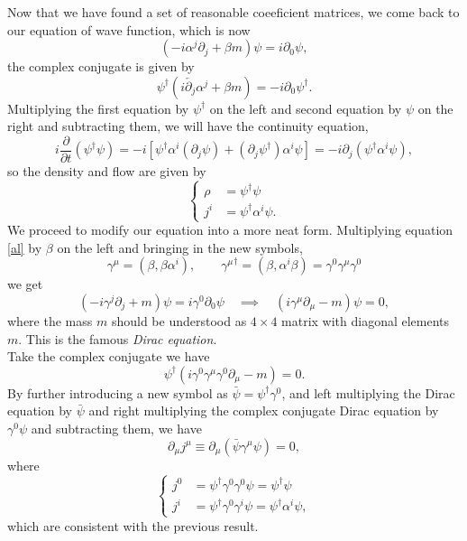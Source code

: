 \documentclass{article}
\newcommand{\be}{\begin{equation}}
\newcommand{\ee}{\end{equation}}
\newcommand{\p}{\partial}
\newcommand{\1}{\left}
\newcommand{\2}{\right}
\newcommand{\m}{\mu}
\newcommand{\al}{\alpha}
\newcommand{\bet}{\beta}
\begin{document}
Now that we have found a set of reasonable coeeficient matrices, we come back to our equation of wave function, which is now
\be\label{al}
(-i\al^j\p_j+\bet m)\psi=i\p_0\psi,
\ee
the complex conjugate is given by
\be
\psi^\dagger(i\overleftarrow{\p_j}\al^j+\bet m)=-i\p_0\psi^\dagger.
\ee
Multiplying the first equation by $\psi^\dagger$ on the left and second equation by $\psi$ on the right and subtracting them, we will have the continuity equation,
\be
i\frac\p{\p t}\1(\psi^\dagger\psi\2)=-i\1[\psi^\dagger\al^i(\p_j\psi)+(\p_j\psi^\dagger)\al^i\psi\2]=-i\p_j(\psi^\dagger\al^i\psi),
\ee
so the density and flow are given by
\be\1\{\begin{split}
\rho&=\psi^\dagger\psi\\
j^i&=\psi^\dagger\al^i\psi.
\end{split}\2.\ee
We proceed to modify our equation into a more neat form. Multiplying equation \eqref{al} by $\bet$ on the left and bringing in the new symbols,
\be
\gamma^\m=(\bet,\bet \al^i), \qquad {\gamma^\m}^\dagger=(\bet, \al^i\bet)=\gamma^0 \gamma^\m \gamma^0
\ee
we get
\be
(-i\gamma^j\p_j+m)\psi=i\gamma^0\p_0\psi \quad\implies\quad (i\gamma^\m\p_\m-m)\psi=0,
\ee
where the mass $m$ should be understood as $4\times4$ matrix with diagonal elements $m$. This is the famous \textit{Dirac equation}.\\
Take the complex conjugate we have
\be
\psi^\dagger (i\gamma^0 \gamma^\m \gamma^0\p_\m-m)=0.
\ee
By further introducing a new symbol as $\bar\psi=\psi^\dagger\gamma^0$, and left multiplying the Dirac equation by $\bar\psi$ and right multiplying the complex conjugate Dirac equation by $\gamma^0 \psi$ and subtracting them, we have
\be
\p_\m j^\m\equiv\p_\m (\bar\psi\gamma^\m\psi)=0,
\ee
where 
\be\1\{\begin{split}
j^0&=\psi^\dagger\gamma^0\gamma^0\psi=\psi^\dagger\psi\\
j^i&=\psi^\dagger\gamma^0\gamma^i\psi=\psi^\dagger \al^i \psi,
\end{split}\2.\ee
which are consistent with the previous result.\\
\end{document}
